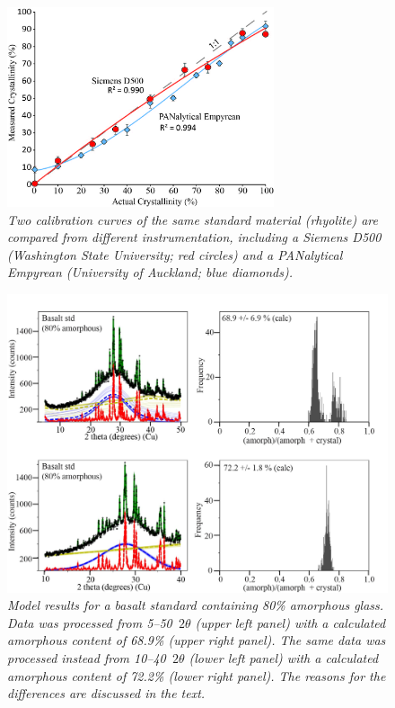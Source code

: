 \documentclass[review]{elsarticle}
\newcommand{\changed}{\color{blue}}
\begin{document}
\begin{figure}[!ht]
\centering
\includegraphics[width=0.7\textwidth]{figures/instruments.jpg}
\caption{\it Two calibration curves of the same standard material (rhyolite) are compared from different instrumentation, including a Siemens D500 (Washington State University; red circles) and a PANalytical Empyrean (University of Auckland; blue diamonds).\label{fig:instruments}}
\end{figure}

\begin{figure}[!ht]
\centering
\includegraphics[width=1\textwidth]{figures/Outputs.jpg}
\caption{\it \changed Model results for a basalt standard containing 80\% amorphous glass. Data was processed from 5--50\degree~$2\theta$ (upper left panel) with a calculated amorphous content of 68.9\% (upper right panel). The same data was processed instead from 10--40\degree~$2\theta$ (lower left panel) with a calculated amorphous content of 72.2\% (lower right panel). The reasons for the
differences are discussed in the text.\label{fig:Outputs}}
\end{figure}
\end{document}
